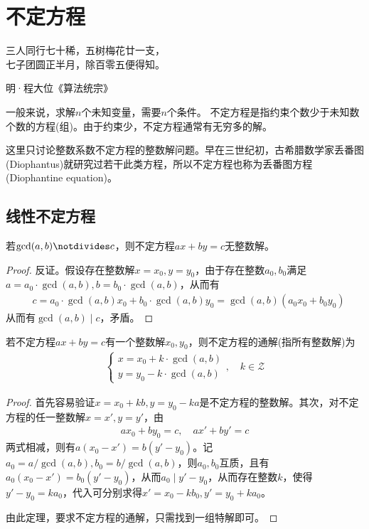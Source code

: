 
\chapter{不定方程}
\label{chap:diophantine-equation}

\epigraph{三人同行七十稀，五树梅花廿一支，\\七子团圆正半月，除百零五便得知。}{明·程大位《算法统宗》}

一般来说，求解$n$个未知变量，需要$n$个条件。
不定方程是指约束个数少于未知数个数的方程(组)。由于约束少，不定方程通常有无穷多的解。

这里只讨论整数系数不定方程的整数解问题。早在三世纪初，古希腊数学家丢番图(Diophantus)就研究过若干此类方程，所以不定方程也称为丢番图方程(Diophantine equation)。

\section{线性不定方程}
\label{sec:linear-diophantine-equation}

\begin{theorem}
  若$\gcd(a,b)\notdivides c$，则不定方程$ax+by=c$无整数解。
\end{theorem}
\begin{proof}
  反证。假设存在整数解$x=x_0, y=y_0$，由于存在整数$a_0,b_0$满足$a=a_0\cdot\gcd(a,b), b=b_0\cdot\gcd(a,b)$，从而有
  \begin{align*}
    &c=a_0\cdot\gcd(a,b)x_0 + b_0\cdot\gcd(a,b)y_0=\gcd(a,b)(a_0x_0+b_0y_0)
  \end{align*}
  从而有$\gcd(a,b)\mid c$，矛盾。
\end{proof}

\begin{theorem}
  若不定方程$ax+by=c$有一个整数解$x_0, y_0$，则不定方程的通解(指所有整数解)为
  \begin{align*}
    \begin{cases}
      x=x_0+k\cdot\gcd(a,b)\\
      y=y_0-k\cdot\gcd(a,b)
    \end{cases}, \quad k\in\mathcal{Z}
  \end{align*}
\end{theorem}
\begin{proof}
  首先容易验证$x=x_0+kb, y=y_0-ka$是不定方程的整数解。其次，对不定方程的任一整数解$x=x', y=y'$，由
  \begin{align*}
    ax_0 + by_0 =c, \quad ax' + by' =c
  \end{align*}
  两式相减，则有$a(x_0-x')=b(y'-y_0)$。记$a_0=a/\gcd(a,b), b_0=b/\gcd(a,b)$，则$a_0,b_0$互质，且有$a_0(x_0-x')=b_0(y'-y_0)$，从而$a_0\mid y'-y_0$，从而存在整数$k$，使得$y'-y_0=ka_0$，代入可分别求得$x'=x_0-kb_0, y'=y_0+ka_0$。

  由此定理，要求不定方程的通解，只需找到一组特解即可。
\end{proof}

